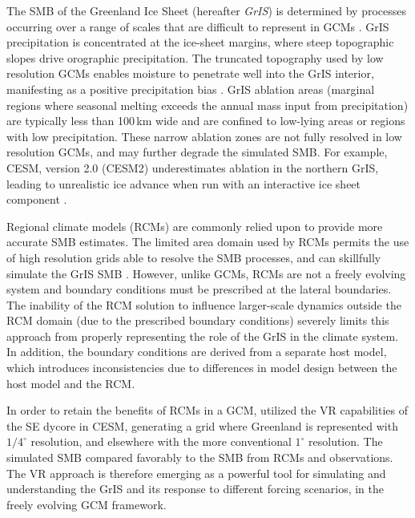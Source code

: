 \documentclass[draft]{agujournal2019}
\begin{document}
The SMB of the Greenland Ice Sheet (hereafter \textit{GrIS}) is determined by processes occurring over a range of scales that are difficult to represent in GCMs \cite{P2010CC}. GrIS precipitation is concentrated at the ice-sheet margins, where steep topographic slopes drive orographic precipitation. The truncated topography used by low resolution GCMs enables moisture to penetrate well into the GrIS interior, manifesting as a positive precipitation bias \cite{P2000GPC,VETAL2018TC}. GrIS ablation areas (marginal regions where seasonal melting exceeds the annual mass input from precipitation) are typically less than 100\,km wide and are confined to low-lying areas or regions with low precipitation. These narrow ablation zones are not fully resolved in low resolution GCMs, and may further degrade the simulated SMB. For example, CESM, version 2.0 (CESM2) underestimates ablation in the northern GrIS, leading to unrealistic ice advance when run with an interactive ice sheet component \cite{LETAL2020JAMES}.

Regional climate models (RCMs) are commonly relied upon to provide more accurate SMB estimates. The limited area domain used by RCMs permits the use of high resolution grids able to resolve the SMB processes, and can skillfully simulate the GrIS SMB \cite{BETAL2004JGR,RETAL2012TC,VETAL2012TC,FETAL2013TC,METAL2017LTS,NETAL2018TC}. However, unlike GCMs, RCMs are not a freely evolving system and boundary conditions must be prescribed at the lateral boundaries. The inability of the RCM solution to influence larger-scale dynamics outside the RCM domain (due to the prescribed boundary conditions) severely limits this approach from properly representing the role of the GrIS in the climate system. In addition, the boundary conditions are derived from a separate host model, which introduces inconsistencies due to differences in model design between the host model and the RCM.

In order to retain the benefits of RCMs in a GCM,  utilized the VR capabilities of the SE dycore in CESM, generating a grid where Greenland is represented with $1/4^{\circ}$ resolution, and elsewhere with the more conventional $1^{\circ}$ resolution. The simulated SMB compared favorably to the SMB from RCMs and observations. The VR approach is therefore emerging as a powerful tool for simulating and understanding the GrIS and its response to different forcing scenarios, in the freely evolving GCM framework.
\end{document}
